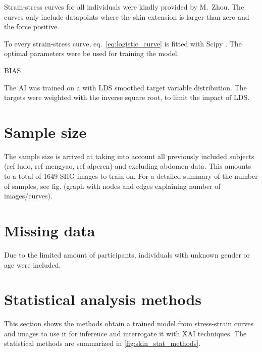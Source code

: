 Strain-stress curves for all individuals were kindly provided by M.\ Zhou.
The curves only include datapoints where the skin extension is larger than zero and the force positive.

To every strain-stress curve, eq.~\ref{eq:logistic_curve} is fitted with Scipy \cite{2020SciPy-NMeth}.
The optimal parameters were be used for training the model.

BIAS

The AI was trained on a with LDS smoothed target variable distribution.
The targets were weighted with the inverse square root, to limit the impact of LDS.

\section{Sample size}
The sample size is arrived at taking into account all previously included subjects (ref ludo, ref mengyao, ref alperen) and excluding abdomen data.
This amounts to a total of 1649 SHG images to train on.
For a detailed summary of the number of samples, see fig. (graph with nodes and edges explaining number of images/curves).

\section{Missing data}
Due to the limited amount of participants, individuals with unknown gender or age were included.

\section{Statistical analysis methods}

This section shows the methods obtain a trained model from stress-strain curves and images to use it for inference and interrogate it with XAI techniques.
The statistical methods are summarized in \cref{fig:skin_stat_methods}.

